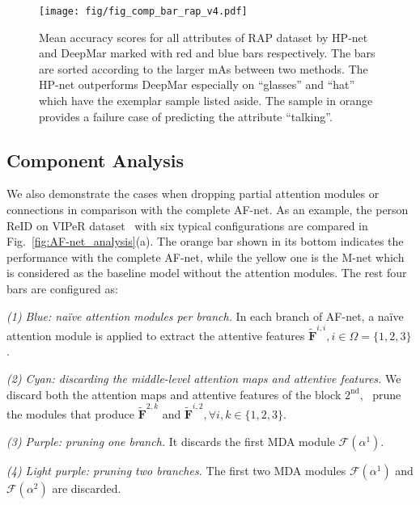 \documentclass[10pt,twocolumn,letterpaper]{article}
\begin{document}
\begin{figure*}[t]
\centering
\texttt{[image: fig/fig\_comp\_bar\_rap\_v4.pdf]}
\caption{
Mean accuracy scores for all attributes of RAP dataset by HP-net and DeepMar marked with red and blue bars respectively. The bars are sorted according to the larger mAs between two methods. The HP-net outperforms DeepMar especially on ``glasses'' and ``hat'' which have the exemplar sample listed aside. The sample in orange provides a failure case of predicting the attribute ``talking''.
}
\label{fig:comp_bar_rap}
\end{figure*}


\subsection{Component Analysis}
\label{subsec:component_analysis}

We also demonstrate the cases when dropping partial attention modules or connections in comparison with the complete AF-net.
%
As an example, the person ReID on VIPeR dataset~\cite{gray2007evaluating} with six typical configurations are compared in Fig.~\ref{fig:AF-net_analysis}(a).
%
The orange bar shown in its bottom indicates the performance with the complete AF-net, while the yellow one is the M-net which is considered as the baseline model without the attention modules.
%
The rest four bars are configured as:

\noindent\textit{(1) Blue: na\"ive attention modules per branch.} In each branch of AF-net, a na\"ive attention module is applied to extract the attentive features $\tilde{\mathbf{F}}^{i,i}, i\in\Omega=\lbrace 1, 2, 3\rbrace$.

\noindent\textit{(2) Cyan: discarding the middle-level attention maps and attentive features.} We discard both the attention maps and attentive features of the block $2^{\text{nd}}$, \ie~prune the modules that produce $\tilde{\mathbf{F}}^{2,k}$ and $\tilde{\mathbf{F}}^{i, 2}, \forall i, k \in \{1, 2, 3\}$.

\noindent\textit{(3) Purple: pruning one branch.} It discards the first MDA module $\mathcal{F}(\alpha^1)$.

\noindent\textit{(4) Light purple: pruning two branches.} The first two MDA modules $\mathcal{F}(\alpha^1)$ and $\mathcal{F}(\alpha^2)$ are discarded.
\end{document}
